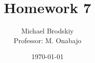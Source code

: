 


\title{Homework 7}
\date{\today}
\author{Michael Brodskiy\\ \small Professor: M. Onabajo}



\maketitle

